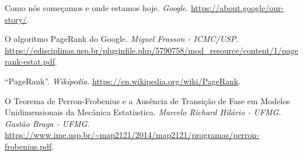 \documentclass{article}
\begin{document}





\newpage
\begin{thebibliography}{9}

 Como nós começamos e onde estamos hoje. \textit{Google}. \url{https://about.google/our-story/}.

 O algoritmo PageRank do Google. \textit{Miguel Frasson - ICMC/USP}. \url{https://edisciplinas.usp.br/pluginfile.php/5790758/mod_resource/content/1/pagerank-estat.pdf}.

 ``PageRank''. \textit{Wikipedia}. \url{https://en.wikipedia.org/wiki/PageRank}.


 O Teorema de Perron-Frobenius e a Ausência de Transição
de Fase em Modelos Unidimensionais da Mecânica
Estatíıstica. \textit{Marcelo Richard Hilário - UFMG. Gastão Braga - UFMG}. \url{https://www.ime.usp.br/~map2121/2014/map2121/programas/perron-frobenius.pdf}.


\end{thebibliography}
\end{document}
